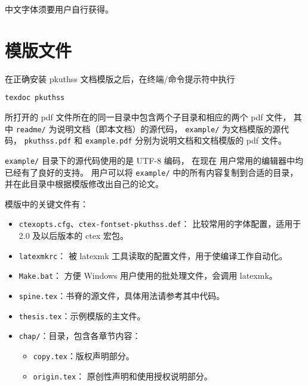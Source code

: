 中文字体须要用户自行获得。

\section{模版文件}\label{sec:doc-dir}

在正确安装 pkuthss 文档模版之后，在终端/命令提示符中执行
\begin{Verbatim}
texdoc pkuthss
\end{Verbatim}
所打开的 pdf 文件所在的同一目录中包含两个子目录和相应的两个 pdf 文件，
其中 \verb|readme/| 为说明文档（即本文档）的源代码，%
\verb|example/| 为文档模版的源代码，%
\verb|pkuthss.pdf| 和 \verb|example.pdf|
分别为说明文档和文档模版的 pdf 文件。

\verb|example/| 目录下的源代码使用的是 UTF-8 编码，
在现在  用户常用的编辑器中均已经有了良好的支持。
用户可以将 \verb|example/| 中的所有内容复制到合适的目录，
并在此目录中根据模版修改出自己的论文。


模版中的关键文件有：
\begin{itemize}
	\item \verb|ctexopts.cfg|、\verb|ctex-fontset-pkuthss.def|：
		比较常用的字体配置，适用于 2.0 及以后版本的
		ctex 宏包。
	\item \verb|latexmkrc|：
		被 latexmk 工具读取的配置文件，用于使编译工作自动化。
	\item \verb|Make.bat|：%
		方便 Windows 用户使用的批处理文件，会调用 latexmk。
	\item \verb|spine.tex|：书脊的源文件，具体用法请参考其中代码。
	\item \verb|thesis.tex|：示例模版的主文件。

	\item \verb|chap/|：目录，包含各章节内容：
	\begin{itemize}
		\item \verb|copy.tex|：版权声明部分。
		\item \verb|origin.tex|：
			原创性声明和使用授权说明部分。
	\end{itemize}
\end{itemize}

